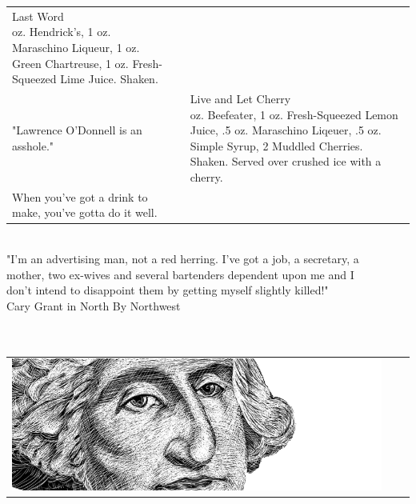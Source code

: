 \documentclass{article}
\makeatletter
\newcommand \Dotfill {\leavevmode \cleaders \hb@xt@ .25em{\hss .\hss }\hfill \kern \z@}%
\makeatother
\begin{document}
{\begin{tabular}{m{}m{}m{}}
{\centering\Huge{Last Word}\\*}
\centering 1 oz. Hendrick's, 1 oz. Maraschino Liqueur, 1 oz. Green Chartreuse, 1 oz. Fresh-Squeezed Lime Juice. Shaken.\\
\centering\small{"Lawrence O'Donnell is an asshole."}
&
&
{\centering\Huge{Live and Let Cherry}\\*}
\centering 2 oz. Beefeater, 1 oz. Fresh-Squeezed Lemon Juice, .5 oz. Maraschino Liqeuer, .5 oz. Simple Syrup, 2 Muddled Cherries. Shaken. Served over crushed ice with a cherry.\\
\centering\small{When you've got a drink to make, you've gotta do it well.}
\end{tabular}
\makebox[\columnwidth]{\Huge\Dotfill}\\[-5pt]
{\Large\centering "I'm an advertising man, not a red herring. I've got a job, a secretary, a\\[-2pt] mother, two ex-wives and several bartenders dependent upon me and I\\[-2pt] don't intend to disappoint them by getting myself slightly killed!" \\[-2pt] \large Cary Grant in North By Northwest}\\[-2pt]
\makebox[1.007\columnwidth]{\hspace{-.5in}\Huge\Dotfill}\\[-1pt]
\marginnote{\rotatebox{90}{
\begin{tabular}{l}
    \Huge\Dotfill \\
    \Huge \hspace{1.4in} Brandy \hspace{7in} \\[-4pt]
    \Huge\Dotfill\\\vspace{-.35in}
\end{tabular}
}}
\makebox[1.007\columnwidth]{\hspace{-.5in}\Huge\Dotfill}\\
\begin{tabular}{m{}m{}m{}}
\includegraphics[scale=1]{patriot.png}

\end{tabular}}
\end{document}
